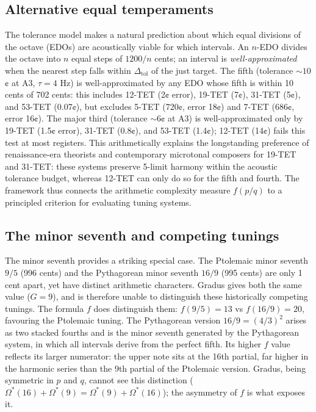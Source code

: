 \documentclass[11pt,a4paper]{article}
\newcommand{\Os}{\Omega^{*}}
\begin{document}
\subsection*{Alternative equal temperaments}

The tolerance model makes a natural prediction about which equal divisions of
the octave (EDOs) are acoustically viable for which intervals. An $n$-EDO
divides the octave into $n$ equal steps of $1200/n$ cents; an interval is
\emph{well-approximated} when the nearest step falls within
$\Delta_{\mathrm{tol}}$ of the just target. The fifth (tolerance $\sim 10$¢
at A3, $\tau = 4$ Hz) is well-approximated by any EDO whose fifth is within
10 cents of 702 cents: this includes 12-TET (2¢ error), 19-TET (7¢), 31-TET
(5¢), and 53-TET (0.07¢), but excludes 5-TET (720¢, error 18¢) and
7-TET (686¢, error 16¢). The major third (tolerance $\sim 6$¢ at A3) is
well-approximated only by 19-TET (1.5¢ error), 31-TET (0.8¢), and 53-TET
(1.4¢); 12-TET (14¢) fails this test at most registers. This arithmetically
explains the longstanding preference of renaissance-era theorists and
contemporary microtonal composers for 19-TET and 31-TET: these systems
preserve 5-limit harmony within the acoustic tolerance budget, whereas 12-TET
can only do so for the fifth and fourth. The framework thus connects the
arithmetic complexity measure $f(p/q)$ to a principled criterion for
evaluating tuning systems.

\subsection*{The minor seventh and competing tunings}

The minor seventh provides a striking special case. The Ptolemaic minor
seventh $9/5$ (996 cents) and the Pythagorean minor seventh $16/9$ (995
cents) are only 1 cent apart, yet have distinct arithmetic characters.
Gradus gives both the same value ($G = 9$), and is therefore unable to
distinguish these historically competing tunings. The formula $f$ does
distinguish them: $f(9/5) = 13$ vs $f(16/9) = 20$, favouring the Ptolemaic
tuning. The Pythagorean version $16/9 = (4/3)^2$ arises as two stacked fourths and
is the minor seventh generated by the Pythagorean system, in which all
intervals derive from the perfect fifth. Its higher $f$ value reflects its
larger numerator: the upper note sits at the 16th partial, far higher in the
harmonic series than the 9th partial of the Ptolemaic version. Gradus, being
symmetric in $p$ and $q$, cannot see this distinction ($\Os(16) + \Os(9) =
\Os(9) + \Os(16)$); the asymmetry of $f$ is what exposes it.
\end{document}
